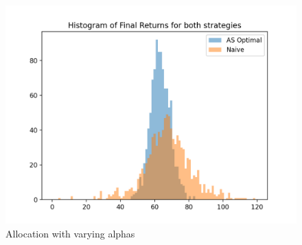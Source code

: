 \documentclass{article}[12pt]
\begin{document}
\begin{figure}
  \includegraphics[width=\linewidth]{histogram.png}
  \caption{Allocation with varying alphas}
  \label{fig:llp3}
\end{figure}
\end{document}
